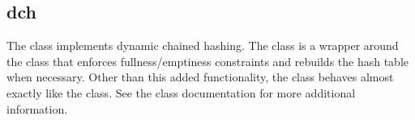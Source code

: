 %
%
%
%
%              

\subsection{dch}
\label{dch}

The  class implements dynamic chained hashing.  The
 class is a wrapper around the  class that enforces
fullness/emptiness constraints and rebuilds the hash table when necessary.
Other than this added functionality, the  class behaves almost
exactly like the  class.  See the 
class documentation for more additional information.

